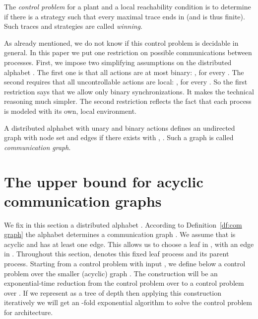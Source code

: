 \documentclass{llncs}
\begin{document}
\begin{definition}
The \emph{control problem} for a plant  and a local reachability
condition  is to determine if there is a strategy
 such that every maximal trace  ends 
in  (and is thus finite).  Such traces and
strategies are called \emph{winning}.
\end{definition}


As already mentioned, we do not know if this control problem is
decidable in general. In this paper we put one restriction on possible
communications between processes. First, we impose two
simplifying assumptions on the distributed alphabet . The 
first one is that all actions are at most binary: ,
for every . The second requires that all uncontrollable
actions are local: , for every . So the first restriction says that we allow only
binary synchronizations. It makes the technical reasoning much
simpler. The second restriction reflects the fact that each process is
modeled with its own, local environment.



\begin{definition}\label{df:com graph}
A distributed alphabet  with unary and binary actions
defines an undirected graph  with node set  and edges 
if there exists  with , . Such a
graph is called \emph{communication graph}. 
\end{definition}












\section{The upper bound for acyclic communication graphs}

We fix in this section a distributed alphabet
. According to Definition~\ref{df:com graph} the alphabet
determines a communication graph . We assume that  is
acyclic and has at least one edge. This allows us to choose a leaf  in , with  an edge in . Throughout this
section,  denotes this fixed leaf process and  its parent
process. Starting from a
control problem with input ,  we define below a
control problem over the smaller (acyclic) graph . The construction will be an exponential-time
reduction from the control problem over  to a control problem
over . If we represent  as a tree of depth  then
applying this construction iteratively we will get an -fold
exponential algorithm to solve the control problem for 
architecture.
\end{document}
